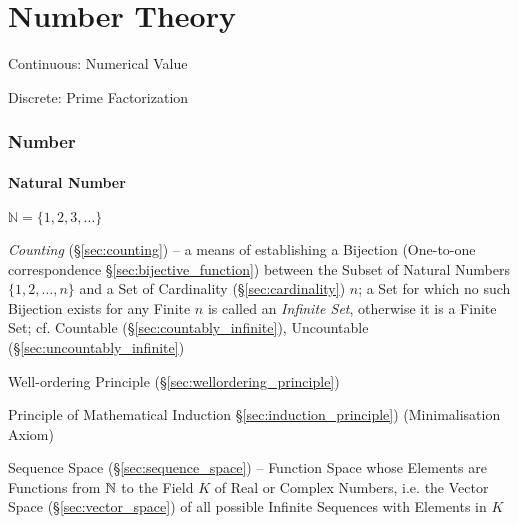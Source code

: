 \part{Number Theory}\label{sec:number_theory}


Continuous: Numerical Value

Discrete: Prime Factorization



\section{Number}\label{sec:number}

\subsection{Natural Number}\label{sec:natural_number}

$\mathbb{N} = \{ 1,2,3,\ldots \}$

\fist \emph{Counting} (\S\ref{sec:counting}) --
a means of establishing a Bijection (One-to-one correspondence
\S\ref{sec:bijective_function}) between the Subset of Natural Numbers
$\{1, 2, \ldots, n\}$ and a Set of Cardinality (\S\ref{sec:cardinality}) $n$; a
Set for which no such Bijection exists for any Finite $n$ is called an
\emph{Infinite Set}, otherwise it is a Finite Set;
cf. Countable (\S\ref{sec:countably_infinite}), Uncountable
(\S\ref{sec:uncountably_infinite})

Well-ordering Principle (\S\ref{sec:wellordering_principle})

Principle of Mathematical Induction \S\ref{sec:induction_principle})
(Minimalisation Axiom)

\fist Sequence Space (\S\ref{sec:sequence_space}) -- Function Space whose
Elements are Functions from $\mathbb{N}$ to the Field $K$ of Real or Complex Numbers,
i.e. the Vector Space (\S\ref{sec:vector_space}) of all possible Infinite
Sequences with Elements in $K$



